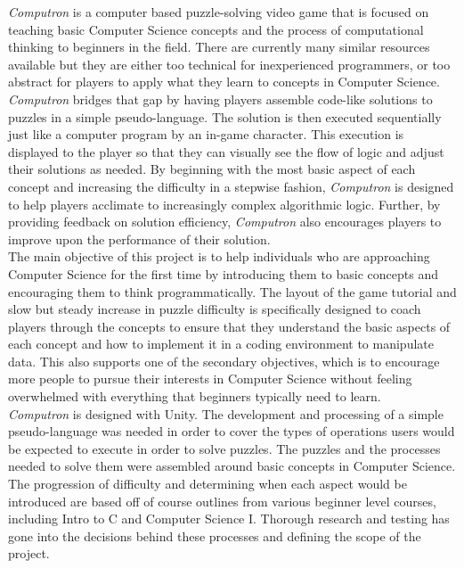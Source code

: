 \textit{Computron} is a computer based puzzle-solving video game that is focused
on teaching basic Computer Science concepts and the process of computational
thinking to beginners in the field. There are currently many similar resources
available but they are either too technical for inexperienced programmers, or
 too abstract for players to apply what they learn to concepts in Computer
Science. \textit{Computron} bridges that gap by having players assemble code-like
solutions to puzzles in a simple pseudo-language. The solution is then executed
sequentially just like a computer program by an in-game character. This
execution is displayed to the player so that they can visually see the flow of
logic and adjust their solutions as needed. By beginning with the most basic
aspect of each concept and increasing the difficulty in a stepwise fashion,
\textit{Computron} is designed to help players acclimate to increasingly complex
algorithmic logic. Further, by providing feedback on solution efficiency,
\textit{Computron} also encourages players to improve upon the performance of
their solution.\\

The main objective of this project is to help individuals who are approaching
Computer Science for the first time by introducing them to basic concepts and
encouraging them to think programmatically. The layout of the game tutorial
and slow but steady increase in puzzle difficulty is specifically designed to coach
players through the concepts to ensure that they understand the basic aspects
of each concept and how to implement it in a coding environment to manipulate
data. This also supports one of the secondary objectives, which is to encourage
more people to pursue their interests in Computer Science without feeling
overwhelmed with everything that beginners typically need to learn.\\

\textit{Computron} is designed with Unity. The development and processing of 
a simple pseudo-language was needed in order to cover the types of operations 
users would be expected to execute in order to solve puzzles. The puzzles and the 
processes needed to solve them were assembled around basic concepts in Computer 
Science. The progression of difficulty and determining when each aspect would be 
introduced are based off of course outlines from various beginner level courses, 
including Intro to C and Computer Science I. Thorough research and testing has 
gone into the decisions behind these processes and defining the scope of the project.\\